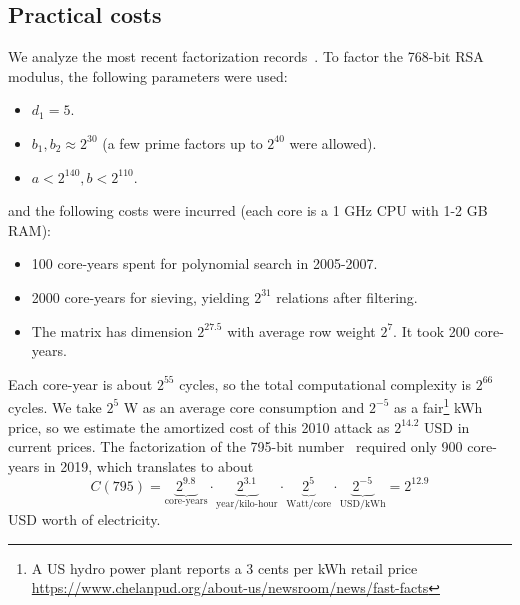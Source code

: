 \documentclass[a4paper]{article}
\begin{document}
\subsection{Practical costs} We analyze the most recent factorization records~\cite{DBLP:conf/crypto/KleinjungAFLTBGKMORTZ10,DBLP:journals/iacr/BaiTZ12,factor795}. To factor the 768-bit RSA modulus, the following parameters were used:
\begin{itemize}
    \item $d_1= 5$.
    \item $b_1,b_2 \approx 2^{30}$ (a few prime factors up to $2^{40}$ were allowed). 
    \item $a<2^{140}, b<2^{110}$.
\end{itemize}
and the following costs were incurred (each core is a 1 GHz CPU with 1-2 GB RAM):
\begin{itemize}
    \item 100 core-years spent for polynomial search in 2005-2007.
    \item 2000 core-years for sieving, yielding $2^{31}$ relations after filtering.
    \item The matrix has dimension $2^{27.5}$  with average row weight $2^7$. It took 200 core-years.
\end{itemize}
Each core-year is about $2^{55}$ cycles, so the total computational complexity is $2^{66}$ cycles.  We take $2^5$ W as an average core consumption and $2^{-5}$ as a fair\footnote{A US hydro power plant reports a 3 cents per kWh retail price \url{https://www.chelanpud.org/about-us/newsroom/news/fast-facts}} kWh price, so we  estimate the amortized cost of this 2010 attack as   $2^{14.2}$ USD in current prices. The factorization of the 795-bit number~\cite{factor795} required only 900 core-years in 2019, which translates to about 
\begin{equation}\label{c795}
C(795) = 
\underbrace{2^{9.8}}_{\text{core-years}}\cdot
\underbrace{2^{3.1}}_{\text{year/kilo-hour}}\cdot
\underbrace{2^{5}}_{\text{Watt/core}}\cdot
\underbrace{2^{-5}}_{\text{USD/kWh}}=
2^{12.9}    
\end{equation}
 USD worth of electricity.


\end{document}

